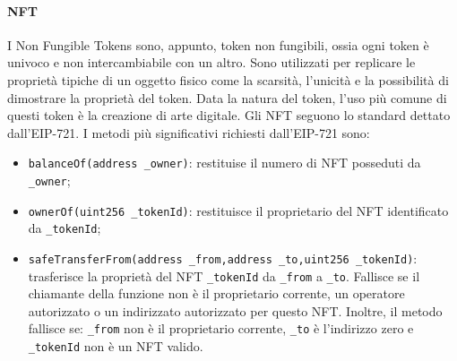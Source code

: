 \documentclass[a4paper]{article}
\begin{document}
    \paragraph{NFT}
    I Non Fungible Tokens sono, appunto, token non fungibili, ossia ogni token è univoco e non intercambiabile con un altro. Sono utilizzati per replicare le proprietà tipiche
    di un oggetto fisico come la scarsità, l'unicità e la possibilità di dimostrare la proprietà del token\cite{nft}.
    Data la natura del token, l'uso più comune di questi token è la creazione di arte digitale\cite{nftuse}.
    \newline
    Gli NFT seguono lo standard dettato dall'EIP-721. I metodi più significativi richiesti dall'EIP-721 sono:
    \begin{itemize}
      \item \verb|balanceOf(address _owner)|: restituise il numero di NFT posseduti da \verb|_owner|;
      \item \verb|ownerOf(uint256 _tokenId)|: restituisce il proprietario del NFT identificato da \verb|_tokenId|;
      \item \verb|safeTransferFrom(address _from,address _to,uint256 _tokenId)|: trasferisce la proprietà del NFT \verb|_tokenId| da \verb|_from| a \verb|_to|.
            Fallisce se il chiamante della funzione non è il proprietario corrente, un operatore autorizzato o un indirizzato autorizzato per questo NFT.
            Inoltre, il metodo fallisce se: \verb|_from| non è il proprietario corrente, \verb|_to| è l'indirizzo zero e \verb|_tokenId| non è un NFT valido\cite{eip1155}.
    \end{itemize}
\end{document}
